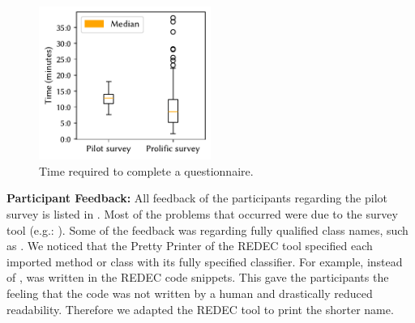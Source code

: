 \documentclass[%
class=scrreprt,
chapterprefix=false,%
open=right,%
twoside=false,%
paper=a4,%
logofile={Logo\_zentral\_farbig\_EN.png},%
thesistype=master,%
UKenglish,%
]{se2thesis}
\theoremstyle{definition}
\newcommand{\rdh}{REDEC\xspace}
\begin{document}
	\begin{figure}[tb]
		\centering
		\includegraphics[width=0.5\textwidth]{img/survey_times.pdf}
		\caption{Time required to complete a questionnaire.}
		\label{fig:survey_times}
	\end{figure}
		
	\textbf{Participant Feedback:}
	All feedback of the participants regarding the pilot survey is listed in .
	Most of the problems that occurred were due to the survey tool (e.g.: ).
	Some of the feedback was regarding fully qualified class names, such as . We noticed that the Pretty Printer of the \rdh tool specified each imported method or class with its fully specified classifier. For example, instead of ,  was written in the \rdh code snippets. This gave the participants the feeling that the code was not written by a human and drastically reduced readability. Therefore we adapted the \rdh tool to print the shorter name.
	
\end{document}

